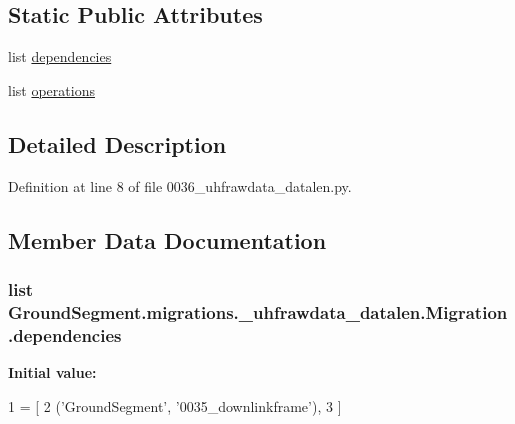 \subsection*{Static Public Attributes}
\begin{DoxyCompactItemize}
\item 
list \hyperlink{class_ground_segment_1_1migrations_1_10036__uhfrawdata__datalen_1_1_migration_ac2aea912d17c6ee862ea6b8941af4e3b}{dependencies}
\item 
list \hyperlink{class_ground_segment_1_1migrations_1_10036__uhfrawdata__datalen_1_1_migration_a9dc0a96e973aa38ed761fb6261e840d1}{operations}
\end{DoxyCompactItemize}


\subsection{Detailed Description}


Definition at line 8 of file 0036\+\_\+uhfrawdata\+\_\+datalen.\+py.



\subsection{Member Data Documentation}
\hypertarget{class_ground_segment_1_1migrations_1_10036__uhfrawdata__datalen_1_1_migration_ac2aea912d17c6ee862ea6b8941af4e3b}{}
\subsubsection[{dependencies}]{\setlength{\rightskip}{0pt plus 5cm}list Ground\+Segment.\+migrations.\+\_\+uhfrawdata\+\_\+datalen.\+Migration.\+dependencies\hspace{0.3cm}{\ttfamily [static]}}\label{class_ground_segment_1_1migrations_1_10036__uhfrawdata__datalen_1_1_migration_ac2aea912d17c6ee862ea6b8941af4e3b}
{\bfseries Initial value\+:}
\begin{DoxyCode}
1 = [
2         (\textcolor{stringliteral}{'GroundSegment'}, \textcolor{stringliteral}{'0035\_downlinkframe'}),
3     ]
\end{DoxyCode}


